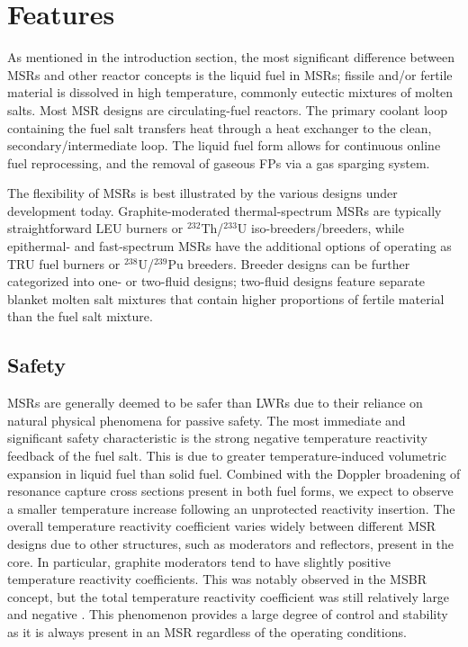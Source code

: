 \section{Features}

As mentioned in the introduction section, the most significant difference
between \glspl{MSR} and other reactor concepts is the liquid fuel in
\glspl{MSR}; fissile and/or fertile material is dissolved in high temperature,
commonly eutectic mixtures of molten salts. Most \gls{MSR} designs are
circulating-fuel reactors. The primary coolant loop containing the fuel salt
transfers heat through a heat exchanger to the clean, secondary/intermediate
loop. The liquid fuel form allows for continuous online fuel reprocessing,
and the removal of gaseous \glspl{FP} via a gas sparging system.

The flexibility of \glspl{MSR} is best illustrated by the various designs
under development today. Graphite-moderated thermal-spectrum \glspl{MSR} are
typically straightforward \gls{LEU} burners or $^{232}$Th/$^{233}$U
iso-breeders/breeders, while epithermal- and fast-spectrum \glspl{MSR} have
the additional options of operating as \gls{TRU} fuel burners or
$^{238}$U/$^{239}$Pu breeders. Breeder designs can be further categorized into
one- or two-fluid designs; two-fluid designs feature separate blanket molten
salt mixtures that contain higher proportions of fertile material than the
fuel salt mixture.

\subsection{Safety}

\glspl{MSR} are generally deemed to be safer than \glspl{LWR} due to their
reliance on natural physical phenomena for passive safety.
The most immediate and significant safety characteristic is the strong
negative temperature reactivity feedback of the fuel salt. This is due to
greater temperature-induced volumetric expansion in liquid fuel than solid
fuel. Combined with the Doppler broadening of resonance capture cross sections
present in both fuel forms, we expect to observe a smaller temperature
increase following an unprotected reactivity insertion. The overall
temperature reactivity coefficient varies widely between different \gls{MSR}
designs due to other structures, such as moderators and reflectors, present in
the core. In particular, graphite moderators tend to have slightly positive
temperature reactivity coefficients. This was notably observed in the
\gls{MSBR} concept, but the total temperature reactivity coefficient was still
relatively large and negative \cite{rykhlevskii_modeling_2019}. This
phenomenon provides a large degree of control and stability as it is always
present in an \gls{MSR} regardless of the operating conditions.

